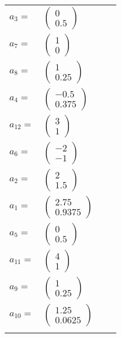 \documentclass[1p]{elsarticle_modified}
\theoremstyle{definition}
\begin{document}
\begin{tabular}{m{7pt} m{180pt} m{7pt} m{180pt} }
\flushright $a_{3}=$&$\begin{pmatrix}0\\0.5\end{pmatrix}$ \\
\flushright $a_{7}=$&$\begin{pmatrix}1\\0\end{pmatrix}$ \\
\flushright $a_{8}=$&$\begin{pmatrix}1\\0.25\end{pmatrix}$ \\
\flushright $a_{4}=$&$\begin{pmatrix}-0.5\\0.375\end{pmatrix}$ \\
\flushright $a_{12}=$&$\begin{pmatrix}3\\1\end{pmatrix}$ \\
\flushright $a_{6}=$&$\begin{pmatrix}-2\\-1\end{pmatrix}$ \\
\flushright $a_{2}=$&$\begin{pmatrix}2\\1.5\end{pmatrix}$ \\
\flushright $a_{1}=$&$\begin{pmatrix}2.75\\0.9375\end{pmatrix}$ \\
\flushright $a_{5}=$&$\begin{pmatrix}0\\0.5\end{pmatrix}$ \\
\flushright $a_{11}=$&$\begin{pmatrix}4\\1\end{pmatrix}$ \\
\flushright $a_{9}=$&$\begin{pmatrix}1\\0.25\end{pmatrix}$ \\
\flushright $a_{10}=$&$\begin{pmatrix}1.25\\0.0625\end{pmatrix}$\\&\end{tabular}
\end{document}
